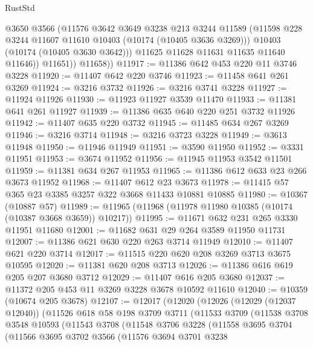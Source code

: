 \begin{lexlean}{RustStd}
\begin{coremodule}
                @3650
                @3566
                (@11576
                  @3642
                  @3649
                  @3238
                  @213
                  @3244
                  @11589
                  (@11598 @228 @3244 @11607 @11610 @10403 (@10174 (@10405 @3636 @3269)))
                  @10403
                  (@10174 (@10405 @3630 @3642)))
                @11625
                @11628
                @11631
                @11635
                @11640
                @11646))
            @11651))
        @11658))
@11917 := @11386 @642 @453 @220 @11 @3746 @3228
@11920 := @11407 @642 @220 @3746
@11923 := @11458 @641 @261 @3269
@11924 := @3216 @3732
@11926 := @3216 @3741 @3228
@11927 := @11924 @11926
@11930 := @11923 @11927 @3539 @11470
@11933 := @11381 @641 @261 @11927
@11939 := @11386 @635 @640 @220 @251 @3732 @11926
@11942 := @11407 @635 @220 @3732
@11945 := @11485 @634 @267 @3269
@11946 := @3216 @3714
@11948 := @3216 @3723 @3228
@11949 := @3613 @11948
@11950 := @11946 @11949
@11951 := @3590 @11950
@11952 := @3331 @11951
@11953 := @3674 @11952
@11956 := @11945 @11953 @3542 @11501
@11959 := @11381 @634 @267 @11953
@11965 := @11386 @612 @633 @23 @266 @3673 @11952
@11968 := @11407 @612 @23 @3673
@11978 := @11415 @57 @365 @23 @3385 @3257 @322 @3668 @11433 @10881 @10885
@11980 := @10367 (@10887 @57)
@11989 := @11965 (@11968 (@11978 @11980 @10385 (@10174 (@10387 @3668 @3659)) @10217))
@11995 := @11671 @632 @231 @265 @3330 @11951 @11680
@12001 := @11682 @631 @29 @264 @3589 @11950 @11731
@12007 := @11386 @621 @630 @220 @263 @3714 @11949
@12010 := @11407 @621 @220 @3714
@12017 := @11515 @220 @620 @208 @3269 @3713 @3675 @10595
@12020 := @11381 @620 @208 @3713
@12026 := @11386 @616 @619 @205 @207 @3680 @3712
@12029 := @11407 @616 @205 @3680
@12037 := @11372 @205 @453 @11 @3269 @3228 @3678 @10592 @11610
@12040 := @10359 (@10674 @205 @3678)
@12107 := @12017
    (@12020
      (@12026
        (@12029 (@12037 @12040))
        (@11526
          @618
          @58
          @198
          @3709
          @3711
          (@11533
            @3709
            (@11538
              @3708
              @3548
              @10593
              (@11543
                @3708
                (@11548
                  @3706
                  @3228
                  (@11558
                    @3695
                    @3704
                    (@11566
                      @3695
                      @3702
                      @3566
                      (@11576
                        @3694
                        @3701
                        @3238

\end{coremodule}
\end{lexlean}
